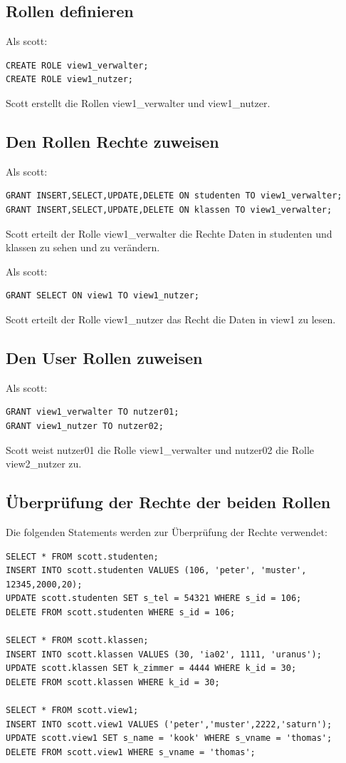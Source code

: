\documentclass[10pt]{scrreprt}
\begin{document}
\subsection{Rollen definieren}
Als scott:
\begin{lstlisting}[style=sql]
CREATE ROLE view1_verwalter;
CREATE ROLE view1_nutzer;
\end{lstlisting}
Scott erstellt die Rollen view1\_verwalter und view1\_nutzer.

\subsection{Den Rollen Rechte zuweisen}
Als scott:
\begin{lstlisting}[style=sql]
GRANT INSERT,SELECT,UPDATE,DELETE ON studenten TO view1_verwalter;
GRANT INSERT,SELECT,UPDATE,DELETE ON klassen TO view1_verwalter;
\end{lstlisting}
Scott erteilt der Rolle view1\_verwalter die Rechte Daten in studenten und klassen zu sehen und zu verändern.

Als scott:
\begin{lstlisting}[style=sql]
GRANT SELECT ON view1 TO view1_nutzer;
\end{lstlisting}
Scott erteilt der Rolle view1\_nutzer das Recht die Daten in view1 zu lesen.

\subsection{Den User Rollen zuweisen}
Als scott:
\begin{lstlisting}[style=sql]
GRANT view1_verwalter TO nutzer01;
GRANT view1_nutzer TO nutzer02;
\end{lstlisting}
Scott weist nutzer01 die Rolle view1\_verwalter und nutzer02 die Rolle view2\_nutzer zu.

\subsection{Überprüfung der Rechte der beiden Rollen}
Die folgenden Statements werden zur Überprüfung der Rechte verwendet:
\begin{lstlisting}[style=sql]
SELECT * FROM scott.studenten;
INSERT INTO scott.studenten VALUES (106, 'peter', 'muster', 12345,2000,20);
UPDATE scott.studenten SET s_tel = 54321 WHERE s_id = 106;
DELETE FROM scott.studenten WHERE s_id = 106;

SELECT * FROM scott.klassen;
INSERT INTO scott.klassen VALUES (30, 'ia02', 1111, 'uranus');
UPDATE scott.klassen SET k_zimmer = 4444 WHERE k_id = 30;
DELETE FROM scott.klassen WHERE k_id = 30;

SELECT * FROM scott.view1;
INSERT INTO scott.view1 VALUES ('peter','muster',2222,'saturn');
UPDATE scott.view1 SET s_name = 'kook' WHERE s_vname = 'thomas';
DELETE FROM scott.view1 WHERE s_vname = 'thomas';
\end{lstlisting}
\end{document}
